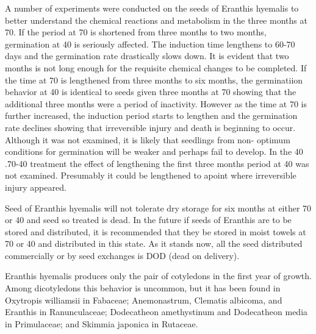 A number of experiments were conducted on the seeds of Eranthis hyemalis to
better understand the chemical reactions and metabolism in the three months at 70. If
the period at 70 is shortened from three months to two months, germination at 40 is
seriously affected. The induction time lengthens to 60-70 days and the germination
rate drastically slows down. It is evident that two months is not long enough for the
requisite chemical changes to be completed. If the time at 70 is lengthened from three
months to six months, the germinatiion behavior at 40 is identical to seeds given three
months at 70 showing that the additional three months were a period of inactivity.
However as the time at 70 is further increased, the induction period starts to lengthen
and the germination rate declines showing that irreversible injury and death is
beginning to occur. Although it was not examined, it is likely that seedlings from non-
optimum conditions for germination will be weaker and perhaps fail to develop. In the
40 .70-40 treatment the effect of lengthening the first three months period at 40 was not
examined. Presumably it could be lengthened to apoint where irreversible injury
appeared.

Seed of Eranthis hyemalis will not tolerate dry storage for six months at either
70 or 40 and seed so treated is dead. In the future if seeds of Eranthis are to be stored
and distributed, it is recommended that they be stored in moist towels at 70 or 40 and
distributed in this state. As it stands now, all the seed distributed commercially or by
seed exchanges is DOD (dead on delivery).

Eranthis hyemalis produces only the pair of cotyledons in the first year of
growth. Among dicotyledons this behavior is uncommon, but it has been found in
Oxytropis williamsii in Fabaceae; Anemonastrum, Clematis albicoma, and Eranthis in
Ranunculaceae; Dodecatheon amethystinum and Dodecatheon media in
Primulaceae; and Skimmia japonica in Rutaceae.

